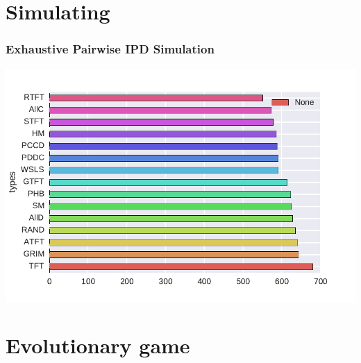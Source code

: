\documentclass[xcolor={usenames,dvipsnames,svgnames}, compress]{beamer}
\begin{document}
\section{Simulating}
{
  \begin{frame}
    \sectionpage
  \end{frame}
}

\begin{frame}
  \frametitle{Exhaustive Pairwise IPD Simulation}
  \begin{center}
    \includegraphics[width=1.0\textwidth]{figures/ex_pairwise.pdf}
  \end{center}
\end{frame}

\section{Evolutionary game}
{
  \begin{frame}
    \sectionpage
  \end{frame}
}
\end{document}
